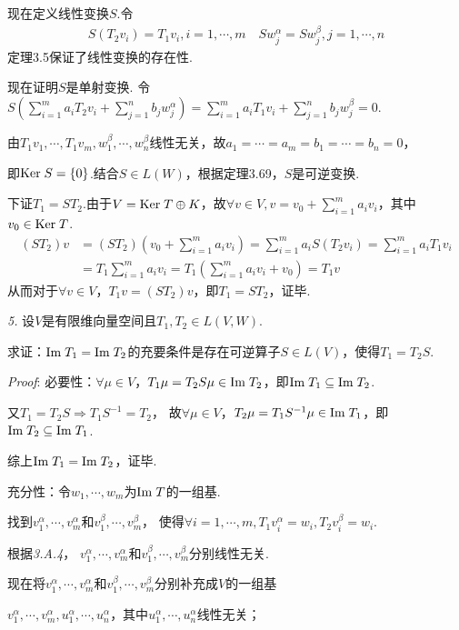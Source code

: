 现在定义线性变换\(S\).令
    \begin{align*}
        S(T_2v_i)=T_1v_i,i=1,\cdots,m \quad Sw_j^\alpha=Sw_j^\beta,j=1,\cdots,n
    \end{align*}
定理3.5保证了线性变换的存在性.

现在证明\(S\)是单射变换.
令\(S(\sum_{i=1}^m a_iT_2v_i+\sum_{j=1}^n b_jw_j^\alpha)=\sum_{i=1}^m a_iT_1v_i+\sum_{j=1}^n b_jw_j^\beta=0\).

由\(T_1v_1,\cdots,T_1v_m,w_1^\beta,\cdots,w_n^\beta\)线性无关，故\(a_1=\cdots=a_m=b_1=\cdots=b_n=0\)，

即\(\mathrm{Ker \;} S=\{0\}\).结合\(S \in L(W)\)，根据定理3.69，\(S\)是可逆变换.

下证\(T_1=ST_2\).由于\(V=\mathrm{Ker \;} T \oplus K\)，故\(\forall v \in V,v=v_0+\sum_{i=1}^m a_iv_i\)，其中\(v_0 \in \mathrm{Ker \;} T\).
    \begin{align*}
        (ST_2)v&=(ST_2)(v_0+\sum_{i=1}^m a_iv_i)=\sum_{i=1}^m a_iS(T_2v_i)=\sum_{i=1}^m a_iT_1v_i \\
            &=T_1\sum_{i=1}^m a_iv_i=T_1(\sum_{i=1}^m a_iv_i+v_0)=T_1v
    \end{align*}
从而对于\(\forall v \in V\)，\(T_1v=(ST_2)v\)，即\(T_1=ST_2\)，证毕.

\newpage

\textit{5.}
设\(V\)是有限维向量空间且\(T_1,T_2 \in L(V,W)\).

求证：\(\mathrm{Im \;} T_1=\mathrm{Im \;} T_2\)的充要条件是存在可逆算子\(S \in L(V)\)，使得\(T_1=T_2S\).

\textit{Proof}:
必要性：\(\forall \mu \in V\)，\(T_1 \mu =T_2S \mu \in \mathrm{Im \;} T_2\)，即\(\mathrm{Im \;} T_1 \subseteq \mathrm{Im \;} T_2\).

又\(T_1=T_2S \Rightarrow T_1S^{-1}=T_2\)，
故\(\forall \mu \in V\)，\(T_2 \mu =T_1S^{-1} \mu \in \mathrm{Im \;} T_1\)，即\(\mathrm{Im \;} T_2 \subseteq \mathrm{Im \;} T_1\).

综上\(\mathrm{Im \;} T_1=\mathrm{Im \;} T_2\)，证毕.

充分性：令\(w_1,\cdots,w_m\)为\(\mathrm{Im \;} T\)的一组基.

找到\(v_1^\alpha,\cdots,v_m^\alpha\)和\(v_1^\beta,\cdots,v_m^\beta\)，
使得\(\forall i=1,\cdots,m,T_1v_i^\alpha=w_i,T_2v_i^\beta=w_i\).

根据\textit{3.A.4}，
\(v_1^\alpha,\cdots,v_m^\alpha\)和\(v_1^\beta,\cdots,v_m^\beta\)分别线性无关.

现在将\(v_1^\alpha,\cdots,v_m^\alpha\)和\(v_1^\beta,\cdots,v_m^\beta\)分别补充成\(V\)的一组基

\(v_1^\alpha,\cdots,v_m^\alpha,u_1^\alpha,\cdots,u_n^\alpha\)，其中\(u_1^\alpha,\cdots,u_n^\alpha\)线性无关；

